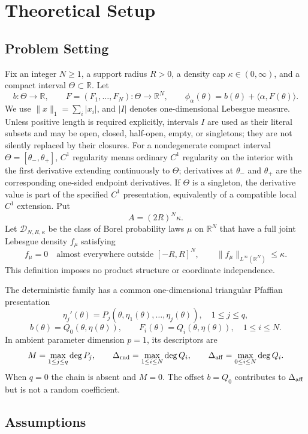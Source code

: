 \section{Theoretical Setup}

\subsection{Problem Setting}

Fix an integer $N\geq 1$, a support radius $R>0$, a density cap
$\kappa\in(0,\infty)$, and a compact interval $\Theta\subset\mathbb R$.
Let
\[
b:\Theta\to\mathbb R,
\qquad
F=(F_1,\ldots,F_N):\Theta\to\mathbb R^N,
\qquad
\phi_\alpha(\theta)=b(\theta)+\langle\alpha,F(\theta)\rangle.
\]
We use $\|x\|_1=\sum_i|x_i|$, and $|I|$ denotes one-dimensional
Lebesgue measure.  Unless positive length is required explicitly, intervals
$I$ are used as their literal subsets and may be open, closed, half-open,
empty, or singletons; they are not silently replaced by their closures.
For a nondegenerate compact interval $\Theta=[\theta_-,\theta_+]$, $C^1$
regularity means ordinary $C^1$ regularity on the interior with the first
derivative extending continuously to $\Theta$; derivatives at $\theta_-$
and $\theta_+$ are the corresponding one-sided endpoint derivatives.  If
$\Theta$ is a singleton, the derivative value is part of the specified
$C^1$ presentation, equivalently of a compatible local $C^1$ extension.
Put
\[
A=(2R)^N\kappa.
\]
Let $\mathcal D_{N,R,\kappa}$ be the class of Borel probability laws $\mu$
on $\mathbb R^N$ that have a full joint Lebesgue density $f_\mu$ satisfying
\[
f_\mu=0\quad\text{almost everywhere outside }[-R,R]^N,
\qquad
\|f_\mu\|_{L^\infty(\mathbb R^N)}\leq\kappa.
\]
This definition imposes no product structure or coordinate independence.

The deterministic family has a common one-dimensional triangular Pfaffian
presentation
\[
\eta_j'(\theta)=P_j(\theta,\eta_1(\theta),\ldots,\eta_j(\theta)),
\quad 1\leq j\leq q,
\]
\[
b(\theta)=Q_0(\theta,\eta(\theta)),
\qquad
F_i(\theta)=Q_i(\theta,\eta(\theta)),\quad 1\leq i\leq N.
\]
In ambient parameter dimension $p=1$, its descriptors are
\[
M=\max_{1\leq j\leq q}\deg P_j,
\qquad
\Delta_{\rm rnd}=\max_{1\leq i\leq N}\deg Q_i,
\qquad
\Delta_{\rm aff}=\max_{0\leq i\leq N}\deg Q_i.
\]
When $q=0$ the chain is absent and $M=0$.  The offset $b=Q_0$ contributes
to $\Delta_{\rm aff}$ but is not a random coefficient.

\subsection{Assumptions}

